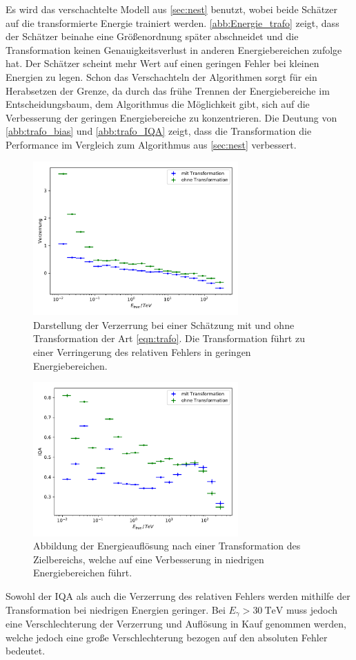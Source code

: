 Es wird das verschachtelte Modell aus \autoref{sec:nest} benutzt, wobei beide Schätzer auf die transformierte Energie trainiert werden.
\autoref{abb:Energie_trafo} zeigt, dass der Schätzer beinahe eine Größenordnung später abschneidet und die Transformation keinen Genauigkeitsverlust
in anderen Energiebereichen zufolge hat.
Der Schätzer scheint mehr Wert auf einen geringen Fehler bei kleinen Energien zu legen.
Schon das Verschachteln der Algorithmen sorgt für ein Herabsetzen der Grenze, da durch das frühe Trennen der Energiebereiche im Entscheidungsbaum, dem
Algorithmus die Möglichkeit gibt, sich auf die Verbesserung der geringen Energiebereiche zu konzentrieren.
Die Deutung von \autoref{abb:trafo_bias} und \autoref{abb:trafo_IQA} zeigt, dass die Transformation die Performance im Vergleich
zum Algorithmus aus \ref{sec:nest} verbessert.
\begin{figure}
  \includegraphics[width=0.7\textwidth]{Plots/trafo_nested_bias.pdf}
  \centering
  \caption{Darstellung der Verzerrung bei einer Schätzung mit und ohne Transformation der Art \eqref{eqn:trafo}. Die Transformation führt zu einer Verringerung
          des relativen Fehlers in geringen Energiebereichen.}
  \label{abb:trafo_bias}
\end{figure}
\begin{figure}
  \includegraphics[width=0.7\textwidth]{Plots/trafo_nested_resolution.pdf}
  \centering
  \caption{Abbildung der Energieauflösung nach einer Transformation des Zielbereichs, welche auf eine Verbesserung in niedrigen Energiebereichen führt.}
  \label{abb:trafo_IQA}
\end{figure}
Sowohl der IQA als auch die Verzerrung des relativen Fehlers werden mithilfe der Transformation bei niedrigen Energien geringer.
Bei $E_\gamma > \SI{30}{\tera\eV}$ muss jedoch eine Verschlechterung der Verzerrung und Auflösung in Kauf genommen werden, welche jedoch eine große Verschlechterung
bezogen auf den absoluten Fehler bedeutet.

